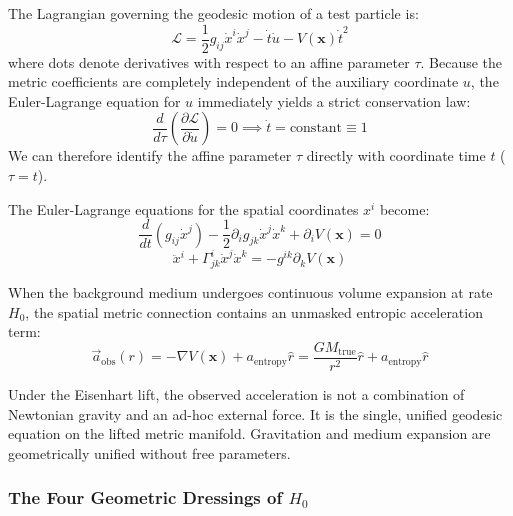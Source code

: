 \documentclass[11pt,a4paper]{article}
\begin{document}
The Lagrangian governing the geodesic motion of a test particle is:
\begin{equation}
\mathcal{L} = \frac{1}{2} g_{ij} \dot{x}^i \dot{x}^j - \dot{t} \dot{u} - V(\mathbf{x}) \dot{t}^2
\label{eq:eisenhart_lagrangian}
\end{equation}
where dots denote derivatives with respect to an affine parameter $\tau$. Because the metric coefficients are completely independent of the auxiliary coordinate $u$, the Euler-Lagrange equation for $u$ immediately yields a strict conservation law:
\begin{equation}
\frac{d}{d\tau} \left(\frac{\partial \mathcal{L}}{\partial \dot{u}}\right) = 0 \implies \dot{t} = \text{constant} \equiv 1
\end{equation}
We can therefore identify the affine parameter $\tau$ directly with coordinate time $t$ ($\tau = t$).

The Euler-Lagrange equations for the spatial coordinates $x^i$ become:
\begin{equation}
\frac{d}{dt} \left( g_{ij} \dot{x}^j \right) - \frac{1}{2} \partial_i g_{jk} \dot{x}^j \dot{x}^k + \partial_i V(\mathbf{x}) = 0
\end{equation}
\begin{equation}
\ddot{x}^i + \Gamma^i_{jk} \dot{x}^j \dot{x}^k = -g^{ik} \partial_k V(\mathbf{x})
\end{equation}

When the background medium undergoes continuous volume expansion at rate $H_0$, the spatial metric connection contains an unmasked entropic acceleration term:
\begin{equation}
\vec{a}_{\text{obs}}(r) = -\nabla V(\mathbf{x}) + a_{\text{entropy}} \hat{r} = \frac{GM_{\text{true}}}{r^2} \hat{r} + a_{\text{entropy}} \hat{r}
\label{eq:eisenhart_acceleration}
\end{equation}

Under the Eisenhart lift, the observed acceleration is not a combination of Newtonian gravity and an ad-hoc external force. It is the single, unified geodesic equation on the lifted metric manifold. Gravitation and medium expansion are geometrically unified without free parameters.

\subsubsection{The Four Geometric Dressings of \texorpdfstring{$H_0$}{H0}}
\label{subsubsec:four_dressings}
\end{document}
